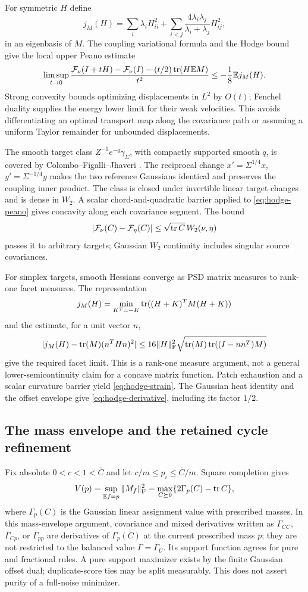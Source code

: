 For symmetric $H$ define
\[
 j_M(H)=\sum_i\lambda_iH_{ii}^2+
       \sum_{i<j}\frac{4\lambda_i\lambda_j}{\lambda_i+\lambda_j}H_{ij}^2,
\]
in an eigenbasis of $M$. The coupling variational formula and the Hodge
bound give the local upper Peano estimate
\begin{equation}\label{eq:hodge-peano}
 \limsup_{t\to0}\frac{\mathcal F_\nu(I+tH)-\mathcal F_\nu(I)
       -(t/2)\operatorname{tr}(H\mathbb E M)}{t^2}\le-\frac18\mathbb E j_M(H).
\end{equation}
Strong convexity bounds optimizing displacements in $L^2$ by $O(t)$;
Fenchel duality supplies the energy lower limit for their weak velocities.
This avoids differentiating an optimal transport map along the covariance
path or assuming a uniform Taylor remainder for unbounded displacements.

The smooth target class $Z^{-1}e^{-q}\gamma_\Sigma$, with compactly supported
smooth $q$, is covered by Colombo--Figalli--Jhaveri \cite{CFJ}. The reciprocal
change $x'=\Sigma^{1/4}x$, $y'=\Sigma^{-1/4}y$ makes the two reference
Gaussians identical and preserves the coupling inner product. The class
is closed under invertible linear target changes and is dense in $W_2$.
A scalar chord-and-quadratic barrier applied to \eqref{eq:hodge-peano}
gives concavity along each covariance segment. The bound
\[
 |\mathcal F_\nu(C)-\mathcal F_\eta(C)|
        \le\sqrt{\operatorname{tr} C}\,W_2(\nu,\eta)
\]
passes it to arbitrary targets; Gaussian $W_2$ continuity includes singular
source covariances.

For simplex targets, smooth Hessians converge as PSD matrix measures to
rank-one facet measures. The representation
\[
 j_M(H)=\min_{K^T=-K}\operatorname{tr}((H+K)^TM(H+K))
\]
and the estimate, for a unit vector $n$,
\[
 |j_M(H)-\operatorname{tr}(M)(n^THn)^2|
 \le16\|H\|_\mathrm F^2
       \sqrt{\operatorname{tr}(M)\operatorname{tr}((I-nn^T)M)}
\]
give the required facet limit. This is a rank-one measure argument, not
a general lower-semicontinuity claim for a concave matrix function.
Patch exhaustion and a scalar curvature barrier yield
\eqref{eq:hodge-strain}. The Gaussian heat identity and the offset envelope
give \eqref{eq:hodge-derivative}, including its factor $1/2$.

\subsection{The mass envelope and the retained cycle refinement}
Fix absolute $0<c<1<\overline C$ and let
$c/m\le p_i\le\overline C/m$. Square completion gives
\begin{equation}\label{eq:Vrepresentation}
 V(p)=\sup_{\mathbb E f=p}\|M_f\|_\mathrm F^2
     =\max_{C\succeq0}\{2\Gamma_p(C)-\operatorname{tr} C\},
\end{equation}
where $\Gamma_p(C)$ is the Gaussian linear assignment value with prescribed
masses. In this mass-envelope argument, covariance and mixed derivatives
written as $\Gamma_{CC}$, $\Gamma_{Cp}$, or $\Gamma_{pp}$ are derivatives
of $\Gamma_p(C)$ at the current prescribed mass $p$; they are not
restricted to the balanced value $\Gamma=\Gamma_U$.
Its support function agrees for pure and fractional rules.
A pure support maximizer exists by the finite Gaussian offset dual;
duplicate-score ties may be split measurably. This does not assert purity
of a full-noise minimizer.


